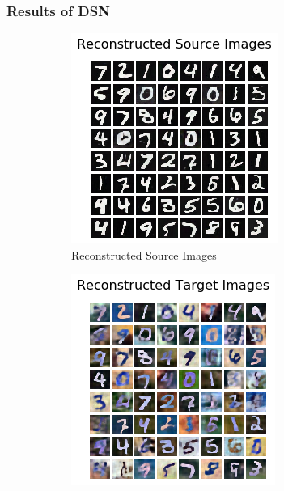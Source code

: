 \documentclass{beamer}
\begin{document}
\begin{frame}
    \frametitle{Results of DSN}

    \begin{figure}
        \centering
        \begin{subfigure}[b]{0.4\linewidth}
            \includegraphics[width=\linewidth]{reconstructed_source.png}
            \caption{\small Reconstructed Source Images}
        \end{subfigure}
        \hfill
        \begin{subfigure}[b]{0.4\linewidth}
            \includegraphics[width=\linewidth]{reconstructed_target.png}

\end{subfigure}
\end{figure}
\end{frame}
\end{document}
